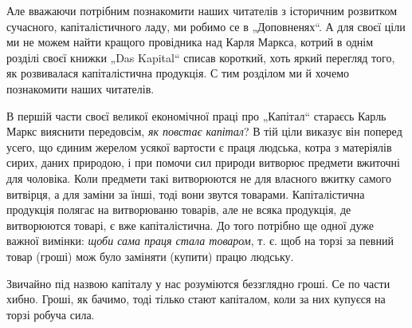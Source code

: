 Але вважаючи потрібним познакомити наших читателів з історичним розвитком сучасного, капіталістичного ладу, ми робимо се в „Доповненях“. А для своєї ціли ми не можем найти кращого провідника над Карля Маркса, котрий в однім розділі своєї книжки „Das Kapital“ списав короткий, хоть яркий перегляд того, як розвивалася капіталістична продукція. С тим розділом ми й хочемо познакомити наших читателів.


В першій
части своєї великої економічної праці про „Капітал“ стараєсь Карль Маркс вияснити передовсім, \emph{як повстає капітал}? В тій ціли виказує він поперед усего, що єдиним жерелом усякої вартости є праця людська, котра з матеріялів сирих, даних природою, і при помочи сил природи витворює предмети вжиточні для чоловіка. Коли предмети такі витворюются не для власного вжитку самого витвірця, а для заміни за їнші, тоді вони звутся товарами. Капіталістична продукція полягає на витворюваню товарів, але не всяка продукція, де витворюются товарі, є вже капіталістична. До того потрібно ще одної дуже важної вимінки: \emph{щоби сама праця стала товаром}, т. є. щоб на торзі за певний товар (гроші) мож було заміняти (купити) працю людську.

Звичайно під назвою капіталу у нас розуміются беззглядно гроші. Се по части хибно. Гроші, як бачимо, тоді тілько стают капіталом, коли за них купуєся на торзі робуча сила.

